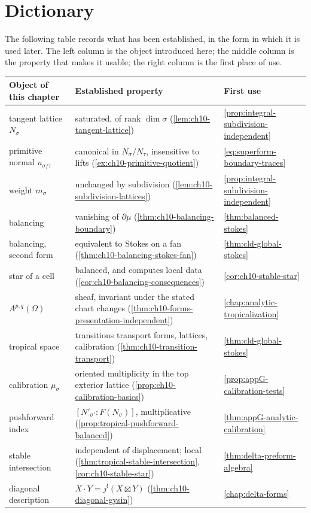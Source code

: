 \section{Dictionary}
\label{sec:ch10-dictionary}

The following table records what has been established, in the form in which
it is used later.  The left column is the object introduced here; the middle
column is the property that makes it usable; the right column is the first
place of use.

\begin{center}
\small
\begin{tabular}{p{}|p{}|p{}}
\textbf{Object of this chapter}&\textbf{Established property}
  &\textbf{First use}\\ \hline
tangent lattice $N_\sigma$
  &saturated, of rank $\dim\sigma$
   (\cref{lem:ch10-tangent-lattice})
  &\cref{prop:integral-subdivision-independent}\\
primitive normal $u_{\sigma/\tau}$
  &canonical in $N_\sigma/N_\tau$, insensitive to lifts
   (\cref{ex:ch10-primitive-quotient})
  &\eqref{eq:superform-boundary-traces}\\
weight $m_\sigma$
  &unchanged by subdivision
   (\cref{lem:ch10-subdivision-lattices})
  &\cref{prop:integral-subdivision-independent}\\
balancing
  &vanishing of $\partial\mu$
   (\cref{thm:ch10-balancing-boundary})
  &\cref{thm:balanced-stokes}\\
balancing, second form
  &equivalent to Stokes on a fan
   (\cref{thm:ch10-balancing-stokes-fan})
  &\cref{thm:cld-global-stokes}\\
star of a cell
  &balanced, and computes local data
   (\cref{cor:ch10-balancing-consequences})
  &\cref{cor:ch10-stable-star}\\
$A^{p,q}(\Omega)$
  &sheaf, invariant under the stated chart changes
   (\cref{thm:ch10-forms-presentation-independent})
  &\cref{chap:analytic-tropicalization}\\
tropical space
  &transitions transport forms, lattices, calibration
   (\cref{thm:ch10-transition-transport})
  &\cref{thm:cld-global-stokes}\\
calibration $\mu_\sigma$
  &oriented multiplicity in the top exterior lattice
   (\cref{prop:ch10-calibration-basics})
  &\cref{prop:appG-calibration-tests}\\
pushforward index
  &$[N'_{\sigma'}:F(N_\sigma)]$, multiplicative
   (\cref{prop:tropical-pushforward-balanced})
  &\cref{thm:appG-analytic-calibration}\\
stable intersection
  &independent of displacement; local
   (\cref{thm:tropical-stable-intersection},
    \cref{cor:ch10-stable-star})
  &\cref{thm:delta-preform-algebra}\\
diagonal description
  &$X\cdot Y=j^!(X\boxtimes Y)$
   (\cref{thm:ch10-diagonal-gysin})
  &\cref{chap:delta-forms}
\end{tabular}
\end{center}

